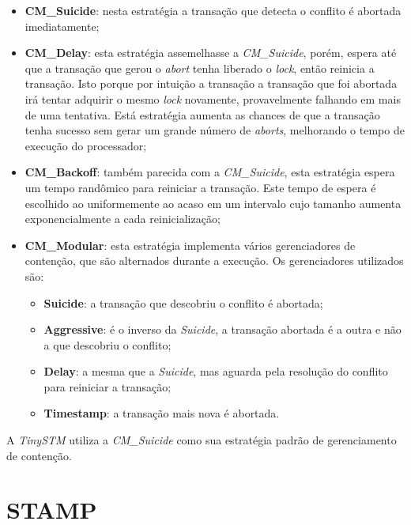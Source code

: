\documentclass[diss,capa]{texufpel}
\begin{document}
\begin{itemize}
  \item \textbf{CM\_Suicide}: nesta estratégia a transação que detecta o conflito é abortada imediatamente;

  \item \textbf{CM\_Delay}: esta estratégia assemelhasse a \emph{CM\_Suicide}, porém, espera até que a transação que gerou o \emph{abort} tenha liberado o \emph{lock}, então reinicia a transação. Isto porque por intuição a transação a transação que foi abortada irá tentar adquirir o mesmo \emph{lock} novamente, provavelmente falhando em mais de uma tentativa. Está estratégia aumenta as chances de que a transação tenha sucesso sem gerar um grande número de \emph{aborts}, melhorando o tempo de execução do processador;

  \item \textbf{CM\_Backoff}: também parecida com a \emph{CM\_Suicide}, esta estratégia espera um tempo randômico para reiniciar a transação. Este tempo de espera é escolhido ao uniformemente ao acaso em um intervalo cujo tamanho aumenta exponencialmente a cada reinicialização;

  \item \textbf{CM\_Modular}: esta estratégia implementa vários gerenciadores de contenção, que são alternados durante a execução. Os gerenciadores utilizados são:

   \begin{itemize}
      \item \textbf{Suicide}: a transação que descobriu o conflito é abortada;

      \item \textbf{Aggressive}: é o inverso da \emph{Suicide}, a transação abortada é a outra e não a que descobriu o conflito;

      \item \textbf{Delay}: a mesma que a \emph{Suicide}, mas aguarda pela resolução do conflito para reiniciar a transação;

      \item \textbf{Timestamp}: a transação mais nova é abortada.
   \end{itemize}

\end{itemize}

A \emph{TinySTM} utiliza a \emph{CM\_Suicide} como sua estratégia padrão de gerenciamento de contenção.

\section{STAMP}
\label{section:stamp}
\end{document}
